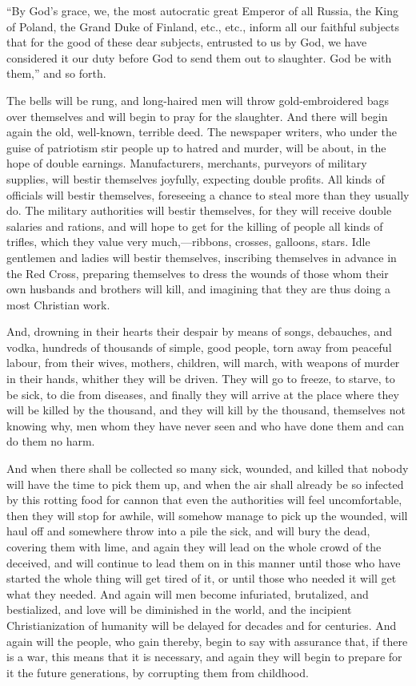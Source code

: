 \documentclass{book}
\begin{document}
“By God’s grace, we, the most autocratic great Emperor of all Russia, the King of Poland, the Grand Duke of Finland, etc., etc., inform all our faithful subjects that for the good of these dear subjects, entrusted to us by God, we have considered it our duty before God to send them out to slaughter. God be with them,” and so forth.

The bells will be rung, and long-haired men will throw gold-embroidered bags over themselves and will begin to pray for the slaughter. And there will begin again the old, well-known, terrible deed. The newspaper writers, who under the guise of patriotism stir people up to hatred and murder, will be about, in the hope of double earnings. Manufacturers, merchants, purveyors of military supplies, will bestir themselves joyfully, expecting double profits. All kinds of officials will bestir themselves, foreseeing a chance to steal more than they usually do. The military authorities will bestir themselves, for they will receive double salaries and rations, and will hope to get for the killing of people all kinds of trifles, which they value very much,—ribbons, crosses, galloons, stars. Idle gentlemen and ladies will bestir themselves, inscribing themselves in advance in the Red Cross, preparing themselves to dress the wounds of those whom their own husbands and brothers will kill, and imagining that they are thus doing a most Christian work.

And, drowning in their hearts their despair by means of songs, debauches, and vodka, hundreds of thousands of simple, good people, torn away from peaceful labour, from their wives, mothers, children, will march, with weapons of murder in their hands, whither they will be driven. They will go to freeze, to starve, to be sick, to die from diseases, and finally they will arrive at the place where they will be killed by the thousand, and they will kill by the thousand, themselves not knowing why, men whom they have never seen and who have done them and can do them no harm.

And when there shall be collected so many sick, wounded, and killed that nobody will have the time to pick them up, and when the air shall already be so infected by this rotting food for cannon that even the authorities will feel uncomfortable, then they will stop for awhile, will somehow manage to pick up the wounded, will haul off and somewhere throw into a pile the sick, and will bury the dead, covering them with lime, and again they will lead on the whole crowd of the deceived, and will continue to lead them on in this manner until those who have started the whole thing will get tired of it, or until those who needed it will get what they needed. And again will men become infuriated, brutalized, and bestialized, and love will be diminished in the world, and the incipient Christianization of humanity will be delayed for decades and for centuries. And again will the people, who gain thereby, begin to say with assurance that, if there is a war, this means that it is necessary, and again they will begin to prepare for it the future generations, by corrupting them from childhood.
\end{document}
